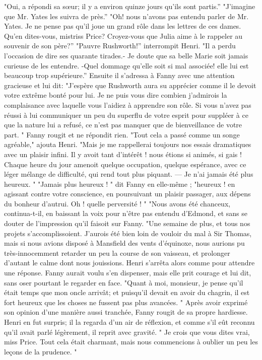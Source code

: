 "Oui, a répondi sa sœur; il y a environ quinze jours qu'ils sont partis.''
"J'imagine que Mr. Yates les suivra de près.''
"Oh! nous n'avons pas entendu parler de Mr. Yates. Je ne pense pas qu'il joue un grand rôle dans les lettres de ces dames. Qu'en dites-vous, mistriss Price? Croyez-vous que Julia aime à le rappeler au souvenir de son père?''
"Pauvre Rushworth!'' interrompit Henri. "Il a perdu l'occasion de dire ses quarante tirades.- Je doute que sa belle Marie soit jamais curieuse de les entendre. -Quel dommage qu'elle soit si mal associée! elle lui est beaucoup trop supérieure.'' Ensuite il s'adressa à Fanny avec une attention gracieuse et lui dit: "J'espère que Rushworth aura su apprécier comme il le devoit votre extrême bonté pour lui. Je ne puis vous dire combien j'admirois la complaisance avec laquelle vous l'aidiez à apprendre son rôle. Si vous n'avez pas réussi à lui communiquer un peu du superflu de votre esprit pour suppléer à ce que la nature lui a refusé, ce n'est pas manquer\setcounter{page}{246} que de bienveillance de votre part. "
Fanny rougit et ne répondit rien.
"Tout cela a passé comme un songe agréable," ajouta Henri. "Mais je me rappellerai toujours nos essais dramatiques avec un plaisir infini. Il y avoit tant d’intérêt ! nous étions si animés, si gais ! Chaque heure du jour amenoit quelque occupation, quelque espérance, avec ce léger mélange de difficulté, qui rend tout plus piquant. — Je n’ai jamais été plus heureux. "
"Jamais plus heureux ! " dit Fanny en elle-même ; "heureux ! en agissant contre votre conscience, en poursuivant un plaisir passager, aux dépens du bonheur d’autrui. Oh ! quelle perversité ! "
"Nous avons été chanceux, continua-t-il, en baissant la voix pour n’être pas entendu d’Edmond, et sans se douter de l’impression qu’il faisoit sur Fanny. "Une semaine de plus, et tous nos projets s’accomplissoient. J’aurois été bien loin de vouloir du mal à Sir Thomas, mais si nous avions disposé à Mansfield des vents d’équinoxe, nous aurions pu très-innocemment retarder un peu la course de son vaisseau, et prolonger d’autant le calme dont nous jouissions.
Henri s’arrêta alors comme pour attendre\setcounter{page}{247} une réponse. Fanny aurait voulu s'en dispenser, mais elle prit courage et lui dit, sans oser pourtant le regarder en face. "Quant à moi, monsieur, je pense qu'il était temps que mon oncle arrivât; et puisqu'il devait en avoir du chagrin, il est fort heureux que les choses ne fussent pas plus avancées. "
Après avoir exprimé son opinion d'une manière aussi tranchée, Fanny rougit de sa propre hardiesse. Henri en fut surpris; il la regarda d'un air de réflexion, et comme s'il eût reconnu qu'il avait parlé légèrement, il reprit avec gravité. " Je crois que vous dites vrai, miss Price. Tout cela était charmant, mais nous commencions à oublier un peu les leçons de la prudence. "
